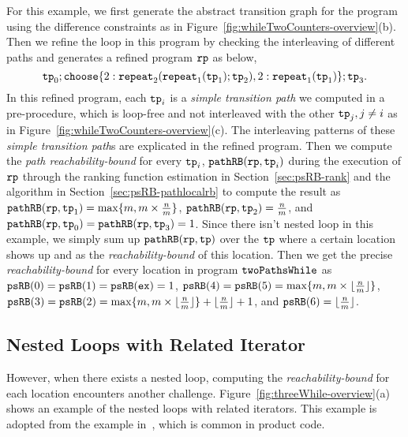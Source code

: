 For this example, we first
generate the abstract transition graph for the program using the difference constraints as in Figure~\ref{fig:whileTwoCounters-overview}(b).
Then we refine the loop in this program by checking the interleaving of different paths and
generates a refined program $\mathtt{rp}$ as below,
% 
\[ \tpath_0 ; 
 \rpchoose{2: \rprepeat_2(\rprepeat_1(\tpath_1); \tpath_2), 
 2: \rprepeat_1(\tpath_1)}; \tpath_3.
\]
In this refined program,
each $\mathtt{tp}_i$ is a \emph{simple transition path} we computed in a pre-procedure, which is loop-free and not interleaved with the other $\mathtt{tp}_j, j \neq i$ as in Figure~\ref{fig:whileTwoCounters-overview}(c).
The interleaving patterns of these \emph{simple transition path}s are explicated in the refined program.
Then we compute the \emph{path reachability-bound} for every $\mathtt{tp}_i$,
$\mathtt{pathRB}(\mathtt{rp}, \mathtt{tp}_i)$ during the execution of $\mathtt{rp}$ through the ranking function estimation in Section~\ref{sec:psRB-rank} and the algorithm in Section~\ref{sec:psRB-pathlocalrb} to compute the result as
$\mathtt{pathRB}(\mathtt{rp}, \mathtt{tp}_1) = \max\{m, m \times \frac{n}{m} \}$,
$\mathtt{pathRB}(\mathtt{rp}, \mathtt{tp}_2) = \frac{n}{m}$,
and $\mathtt{pathRB}(\mathtt{rp}, \mathtt{tp}_0) = \mathtt{pathRB}(\mathtt{rp}, \mathtt{tp}_3) = 1$.
Since there isn't nested loop in this example, we simply sum up $\mathtt{pathRB}(\mathtt{rp}, \mathtt{tp})$ over the $\mathtt{tp}$ where a certain location shows up
and as the \emph{reachability-bound} of this location.
Then we get the precise \emph{reachability-bound} for every location in program $\mathtt{twoPathsWhile}$ as
$\mathtt{psRB}(0) = \mathtt{psRB}(1) = \mathtt{psRB}(\mathtt{ex}) = 1$,
$\mathtt{psRB}(4) = \mathtt{psRB}(5) = \max\{m, m \times \lfloor\frac{n}{m}\rfloor\}$,
$\mathtt{psRB}(3) = \mathtt{psRB}(2) = \max\{m, m \times \lfloor\frac{n}{m}\rfloor\} + \lfloor\frac{n}{m}\rfloor + 1 $,
and $\mathtt{psRB}(6) = \lfloor\frac{n}{m}\rfloor$.
%
\subsection{Nested Loops with Related Iterator}
\label{sec:overview-nestedwhile}
However, when there exists a nested loop, computing the \emph{reachability-bound} for each location encounters another challenge.
Figure~\ref{fig:threeWhile-overview}(a) shows an example of the nested loops with related 
iterators.
This example is adopted from the example in~\cite{GulwaniJK09}, which is common in product code.

